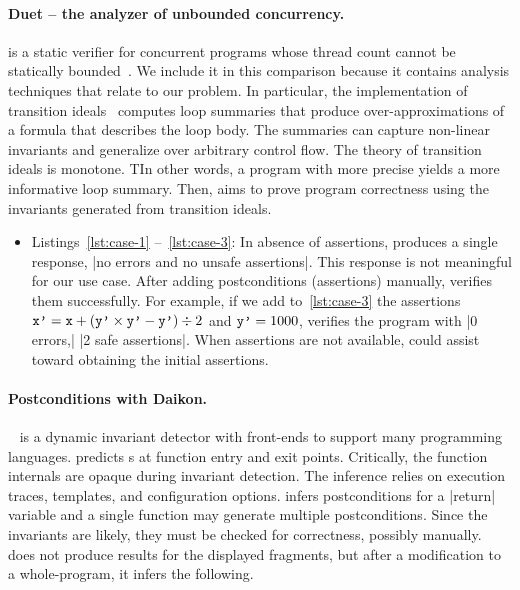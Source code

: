 \paragraph{Duet -- the analyzer of unbounded concurrency.}
 is a static verifier for concurrent programs whose thread count cannot be statically bounded~\cite{duet}.
We include it in this comparison because it contains analysis techniques that relate to our problem.
In particular, the implementation of {transition ideals}~\cite{cyphert2024}
computes {loop summaries} that produce over-approximations of a formula that describes the loop body.
The summaries can capture non-linear invariants and generalize over arbitrary control flow.
The theory of transition ideals is monotone.
TIn other words, a program with more precise  yields a more informative loop summary.
Then,  aims to prove program correctness using the invariants generated from transition ideals.

\begin{itemize}
\item Listings~\ref{lst:case-1} --~\ref{lst:case-3}:
    In absence of assertions,  produces a single response, \pr|no errors and no unsafe assertions|.
    This response is not meaningful for our use case.
    After adding postconditions (assertions) manually,  verifies them successfully.
    For example, if we add to~\autoref{lst:case-3} the assertions
    \(\prm{x'}=\prm{x}+(\prm{y'}\times\prm{y'}-\prm{y'}) \div 2 \) and \(\prm{y'}=1000 \),
     verifies the program with \pr|0 errors,| \pr|2 safe assertions|.
    When assertions are not available, \impl could assist  toward obtaining the initial assertions.
\end{itemize}

\paragraph{Postconditions with Daikon.}
~\cite{ernst2007,daikon} is a dynamic invariant detector with front-ends to support many programming languages.
 predicts s at function entry and exit points.
Critically, the function internals are opaque during invariant detection.
The inference relies on execution traces, templates, and configuration options.
 infers postconditions for a \pr|return| variable
and a single function may generate multiple postconditions.
Since the invariants are likely, they must be checked for correctness, possibly manually.
 does not produce results for the displayed fragments, but after a modification to a whole-program,
it infers the following.

